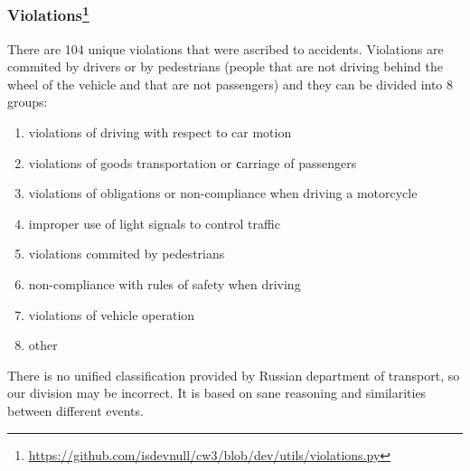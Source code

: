\subsubsection[Violations]{Violations\footnote{\href{https://github.com/isdevnull/cw3/blob/dev/utils/violations.py}
{https://github.com/isdevnull/cw3/blob/dev/utils/violations.py}}}
There are 104 unique violations that were ascribed to accidents. Violations are commited by drivers or by pedestrians
(people that are not driving behind the wheel of the vehicle and that are not passengers) and they can be divided into 8
groups:
\begin{multicols}{2}
\begin{enumerate}[noitemsep]
	\item violations of driving with respect to car motion
	\item violations of goods transportation or сarriage of passengers
	\item violations of obligations or non-compliance when driving a motorcycle
	\item improper use of light signals to control traffic
	\item violations commited by pedestrians
	\item non-compliance with rules of safety when driving
	\item violations of vehicle operation
	\item other
\end{enumerate}
\end{multicols}
There is no unified classification provided by Russian department of transport, so our division may be incorrect.
It is based on sane reasoning and similarities between different events. 
